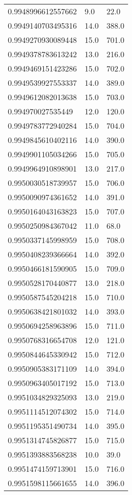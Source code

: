 \begin{center}
\begin{supertabular}[H]{p{0.30\textwidth}p{0.05\textwidth}p{0.05\textwidth}}
0.9948996612557662 & 9.0 & 22.0 \\ 
0.9949140703495316 & 14.0 & 388.0 \\ 
0.9949270930089448 & 15.0 & 701.0 \\ 
0.9949378783613242 & 13.0 & 216.0 \\ 
0.9949469151423286 & 15.0 & 702.0 \\ 
0.9949539927553337 & 14.0 & 389.0 \\ 
0.9949612082013638 & 15.0 & 703.0 \\ 
0.994970027535449 & 12.0 & 120.0 \\ 
0.9949783772940284 & 15.0 & 704.0 \\ 
0.9949845610402116 & 14.0 & 390.0 \\ 
0.9949901105034266 & 15.0 & 705.0 \\ 
0.9949964910898901 & 13.0 & 217.0 \\ 
0.9950030518739957 & 15.0 & 706.0 \\ 
0.9950090974361652 & 14.0 & 391.0 \\ 
0.9950164043163823 & 15.0 & 707.0 \\ 
0.9950250984367042 & 11.0 & 68.0 \\ 
0.9950337145998959 & 15.0 & 708.0 \\ 
0.9950408239366664 & 14.0 & 392.0 \\ 
0.9950466181590905 & 15.0 & 709.0 \\ 
0.9950528170440877 & 13.0 & 218.0 \\ 
0.9950587545204218 & 15.0 & 710.0 \\ 
0.9950638421801032 & 14.0 & 393.0 \\ 
0.9950694258963896 & 15.0 & 711.0 \\ 
0.9950768316654708 & 12.0 & 121.0 \\ 
0.9950844645330942 & 15.0 & 712.0 \\ 
0.9950905383171109 & 14.0 & 394.0 \\ 
0.9950963405017192 & 15.0 & 713.0 \\ 
0.9951034829325093 & 13.0 & 219.0 \\ 
0.9951114512074302 & 15.0 & 714.0 \\ 
0.9951195351490734 & 14.0 & 395.0 \\ 
0.9951314745826877 & 15.0 & 715.0 \\ 
0.9951393883568238 & 10.0 & 39.0 \\ 
0.9951474159713901 & 15.0 & 716.0 \\ 
0.9951598115661655 & 14.0 & 396.0 \\ 

\end{supertabular}
\end{center}
